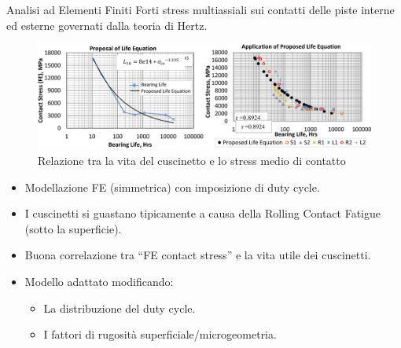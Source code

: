 \documentclass{beamer}
\begin{document}
\begin{frame}[allowframebreaks]{Analisi ad Elementi Finiti}
    Forti stress multiassiali sui contatti delle piste interne ed esterne governati dalla teoria di Hertz.

    \begin{figure}
        \centering
        \includegraphics[width=\textwidth]{Figures/FE_Life_Curve.png}
        \caption{Relazione tra la vita del cuscinetto e lo stress medio di contatto}
        \label{fig:FE_Life_Curve}
    \end{figure}

    \framebreak

    \begin{itemize}
        \item Modellazione FE (simmetrica) con imposizione di duty cycle\cite{raju2018bearing}.
        \item I cuscinetti si guastano tipicamente a causa della Rolling Contact Fatigue (sotto la superficie).
        \item Buona correlazione tra ``FE contact stress'' e la vita utile dei cuscinetti.
        \item Modello adattato modificando:
        \begin{itemize}
            \item La distribuzione del duty cycle.
            \item I fattori di rugosità superficiale/microgeometria.
        \end{itemize}
    \end{itemize}
\end{frame}
\end{document}
